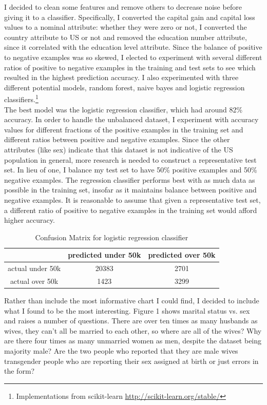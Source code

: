 \documentclass[twoside,12pt]{article}
\begin{document}
I decided to clean some features and remove others to decrease noise before giving it to a classifier. Specifically, I converted the capital gain and capital loss values to a nominal attribute: whether they were zero or not, I converted the country attribute to US or not and removed the education number attribute, since it correlated with the education level attribute. Since the balance of positive to negative examples was so skewed, I elected to experiment with several different ratios of positive to negative examples in the training and test sets to see which resulted in the highest prediction accuracy. I also experimented with three different potential models, random forest, naive bayes and logistic regression classifiers.\footnote{Implementations from scikit-learn \url{http://scikit-learn.org/stable/}}\\

The best model was the logistic regression classifier, which had around 82\% accuracy. In order to handle the unbalanced dataset, I experiment with accuracy values for different fractions of the positive examples in the training set and different ratios between positive and negative examples. Since the other attributes (like sex) indicate that this dataset is not indicative of the US population in general, more research is needed to construct a representative test set. In lieu of one, I balance my test set to have 50\% positive examples and 50\% negative examples. The regression classifier performs best with as much data as possible in the training set, insofar as it maintains balance between positive and negative examples. It is reasonable to assume that given a representative test set, a different ratio of positive to negative examples in the training set would afford higher accuracy.

\begin{table}[ht]

\begin{tabular}{|c|c|c|}
    \hline
    & predicted under 50k & predicted over 50k\\
    \hline
    actual under 50k & 20383 & 2701\\
    \hline
    actual over 50k & 1423 & 3299\\
    \hline
\end{tabular}

\caption{Confusion Matrix for logistic regression classifier}

\end{table}

Rather than include the most informative chart I could find, I decided to include what I found to be the most interesting. Figure 1 shows marital status vs. sex and raises a number of questions. There are over ten times as many husbands as wives, they can't all be married to each other, so where are all of the wives? Why are there four times as many unmarried women as men, despite the dataset being majority male? Are the two people who reported that they are male wives transgender people who are reporting their sex assigned at birth or just errors in the form?
\end{document}
